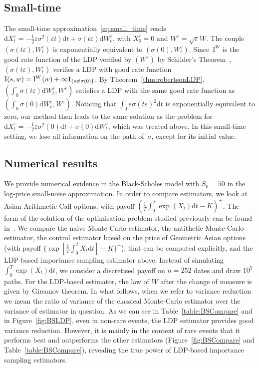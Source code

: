 \documentclass{amsart}[11pt]
\numberwithin{equation}{section}
\numberwithin{theorem}{subsection}
\numberwithin{proposition}{subsection}
\numberwithin{definition}{subsection}
\numberwithin{lemma}{subsection}
\numberwithin{assumption}{subsection}
\newcommand{\D}{\mathrm{d}}
\newcommand{\II}{\mathrm{I}}
\newcommand{\IIW}{\mathrm{I}^{W}}
\newcommand{\eps}{\varepsilon}
\newcommand{\ind}{1\hspace{-2.1mm}{1}} %
\begin{document}
{\subsection{Small-time}
The small-time approximation~\eqref{eq:small_time} reads
$\D X_t^{\eps} = -\frac{1}{2}\eps\sigma^2(\eps t)\D t + \sigma(t\eps) \D W_t^{\eps}$,
with $X_0 ^{\eps} = 0$ and $W^{\eps} = \sqrt{\eps}W$.
The couple $(\sigma(t\eps), W_t^\eps)$ is exponentially equivalent to $(\sigma(0),W_t^\eps)$. 
Since~$\IIW$ is the good rate function of the LDP verified by $(W^\eps)$ by Schilder's Theorem~\cite[Theorem 5.2.3]{Dembo2010}, $(\sigma(t\eps), W_t^\eps)$ verifies a LDP with good rate function $\II(s,w) = \IIW(w) + \infty \ind_{\{s\neq \sigma(0)\}}$. 
By Theorem~\ref{thm:robertsonLDP}, $(\int_{0}^{\cdot}\sigma(t\eps)\D W_t^\eps,W^\eps)$ satisfies a LDP with the same good rate function as $(\int_{0}^{\cdot}\sigma(0)\D W_t^\eps,W^\eps)$. 
Noticing that  $\int_{0}^{\cdot} \eps \sigma(t\eps)^2\D t$ is exponentially equivalent to zero, our method then leads to the same solution as the problem for 
$\D X_t^{\eps} = -\frac{1}{2}\eps\sigma^2(0)\D t + \sigma(0) \D W_t^{\eps}$,
which was treated above. 
In this small-time setting, we lose all information on the path of~$\sigma$, except for its initial value.

\subsection{Numerical results}
We provide numerical evidence in the Black-Scholes model with $S_0=50$ in the log-price small-noise approximation.
In order to compare estimators, we look at Asian Arithmetic Call options, 
with payoff $(\frac{1}{T}\int_0^T \exp(X_t) \D t - K)^+$. The form of the solution of the optimisation problem studied previously can be found in~\cite{Guasoni2007}. We compare the naive Monte-Carlo estimator, the antithetic Monte-Carlo estimator, 
the control estimator based on the price of Geometric Asian options 
(with payoff $\{\exp[\frac{1}{T}\int_0^T X_t \D t] - K\}^+$), 
that can be computed explicitly, 
and the LDP-based importance sampling estimator above.
Instead of simulating $\int_0^T \exp(X_t)\D t$, we consider a discretised payoff on $n=252$ dates and draw $10^5$ paths.
For the LDP-based estimator, the law of $W$ after the change of measure is given by Girsanov theorem.
In what follows, when we refer to variance reduction we mean the ratio of variance of the classical Monte-Carlo estimator over the variance of estimator in question.
As we can see in Table~\ref{table:BSCompare} and in Figure~\ref{fig:BSLDP}, 
even in non-rare events, the LDP estimator provides good variance reduction. 
However, it is mainly in the context of rare events that it performs best and outperforms the other estimators (Figure~\ref{fig:BSCompare} and Table~\ref{table:BSCompare}), 
revealing the true power of LDP-based importance sampling estimators.

}
\end{document}
